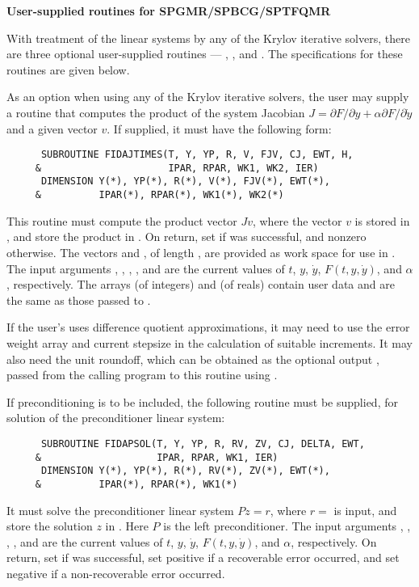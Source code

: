 \begin{Steps}

  {\s}{\p} {\bf User-supplied routines for SPGMR/SPBCG/SPTFQMR}

  With treatment of the linear systems by any of the Krylov iterative
  solvers, there are three optional user-supplied routines ---
  , , and .  The specifications
  for these routines are given below.

  As an option when using any of the Krylov iterative solvers, the user may
  supply a routine that computes the product of the system Jacobian
  $J = \partial F / \partial y + \alpha \partial F / \partial \dot{y}$
  and a given vector $v$.  If supplied, it must have the following form:
\begin{verbatim}
      SUBROUTINE FIDAJTIMES(T, Y, YP, R, V, FJV, CJ, EWT, H, 
     &                      IPAR, RPAR, WK1, WK2, IER)
      DIMENSION Y(*), YP(*), R(*), V(*), FJV(*), EWT(*), 
     &          IPAR(*), RPAR(*), WK1(*), WK2(*)
\end{verbatim}
  This routine must compute the product vector $Jv$, where the vector $v$ is
  stored in , and store the product in .  On return, set
   if  was successful, and nonzero otherwise.
  The vectors  and , of length , are
  provided as work space for use in .
  The input arguments , , , , and  are the
  current values of $t$, $y$, $\dot{y}$, $F(t,y,\dot{y})$, and $\alpha$, respectively.
  The arrays  (of integers) and  (of reals) contain user data
  and are the same as those passed to .

  If the user's  uses difference quotient approximations, it
  may need to use the error weight array  and current stepsize 
  in the calculation of suitable increments.  It may also need the unit
  roundoff, which can be obtained as the optional output ,
  passed from the calling program to this routine using .

  If preconditioning is to be included, the following routine must be
  supplied, for solution of the preconditioner linear system:
\begin{verbatim}
      SUBROUTINE FIDAPSOL(T, Y, YP, R, RV, ZV, CJ, DELTA, EWT, 
     &                    IPAR, RPAR, WK1, IER)
      DIMENSION Y(*), YP(*), R(*), RV(*), ZV(*), EWT(*), 
     &          IPAR(*), RPAR(*), WK1(*)
\end{verbatim}
  It must solve the preconditioner linear system $Pz = r$, where $r =$  
  is input, and store the solution $z$ in . Here $P$ is the left 
  preconditioner.
  The input arguments , , , , and  are the
  current values of $t$, $y$, $\dot{y}$, $F(t,y,\dot{y})$, and $\alpha$, respectively.
  On return, set  if  was successful, set 
  positive if a recoverable error occurred, and set  negative if a 
  non-recoverable error occurred.


\end{Steps}
